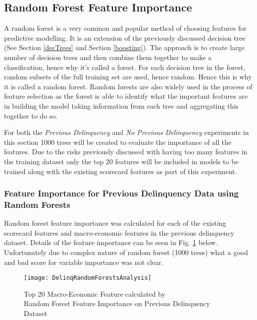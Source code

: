 \subsection{Random Forest Feature Importance}
A random forest is a very common and popular method of choosing features for predictive modelling. It is an extension of the previously discussed decision tree (See Section \ref{decTrees} and Section \ref{boosting}). The approach is to create large number of decision trees and then combine them together to make a classification, hence why it's called a forest. For each decision tree in the forest, random subsets of the full training set are used, hence random. Hence this is why it is called a random forest. Random forests are also widely used in the process of feature selection as the forest is able to identify what the important features are in building the model taking information from each tree and aggregating this together to do so.

For both the \textit{Previous Delinquency} and \textit{No Previous Delinquency} experiments in this section 1000 trees will be created to evaluate the importance of all the features. Due to the risks previously discussed
with having too many features in the training dataset only the top 20 features will be
included in models to be trained along with the existing scorecard features as part of this experiment. 


\subsubsection{Feature Importance for Previous Delinquency Data using Random Forests}\label{RFPDExper}
Random forest feature importance was calculated for
each of the existing scorecard features and macro-economic features in the previous delinquency dataset. Details of the feature importance can be seen in Fig. \ref{fig:DelinqRandomForestsAnalysis} below. Unfortunately due to complex nature of random forest (1000 trees) what a good and bad score for variable importance was not clear.

\begin{figure}[H]
	\texttt{[image: DelinqRandomForestsAnalysis]}
	\caption{Top 20 Macro-Economic Feature calculated by \\
		Random Forest Feature Importance on Previous Delinquency Dataset}
	\label{fig:DelinqRandomForestsAnalysis}
\end{figure}

